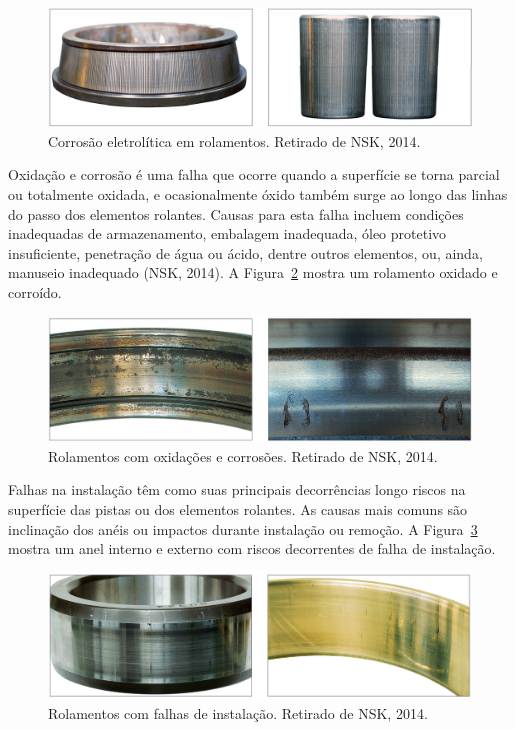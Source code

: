 \documentclass[
	12pt,				
	oneside,			
	a4paper,			
	english,			
	brazil,			
	]{abntex2ppgsi}
\begin{document}
\begin{figure}[H]
\centering
\includegraphics[width=\textwidth,height=\textheight,keepaspectratio]{corrosao_eletrolitica_nsk}
\caption {Corrosão eletrolítica em rolamentos. Retirado de NSK, 2014.}
\label{corrosao_eletrolitica_nsk}
\end{figure}

Oxidação e corrosão é uma falha que ocorre quando a superfície se torna parcial ou totalmente oxidada, e ocasionalmente óxido também surge ao longo das linhas do passo dos elementos rolantes. Causas para esta falha incluem condições inadequadas de armazenamento, embalagem inadequada, óleo protetivo insuficiente, penetração de água ou ácido, dentre outros elementos, ou, ainda, manuseio inadequado (NSK, 2014). A Figura~\ref{oxidacao_nsk} mostra um rolamento oxidado e corroído.

\begin{figure}[H]
\centering
\includegraphics[width=\textwidth,height=\textheight,keepaspectratio]{oxidacao_nsk}
\caption {Rolamentos com oxidações e corrosões. Retirado de NSK, 2014.}
\label{oxidacao_nsk}
\end{figure}

Falhas na instalação têm como suas principais decorrências longo riscos na superfície das pistas ou dos elementos rolantes. As causas mais comuns são inclinação dos anéis ou impactos durante instalação ou remoção. A Figura~\ref{falha_instalacao_nsk} mostra um anel interno e externo com riscos decorrentes de falha de instalação.

\begin{figure}[H]
\centering
\includegraphics[width=\textwidth,height=\textheight,keepaspectratio]{falha_instalacao_nsk}
\caption {Rolamentos com falhas de instalação. Retirado de NSK, 2014.}
\label{falha_instalacao_nsk}
\end{figure}
\end{document}
